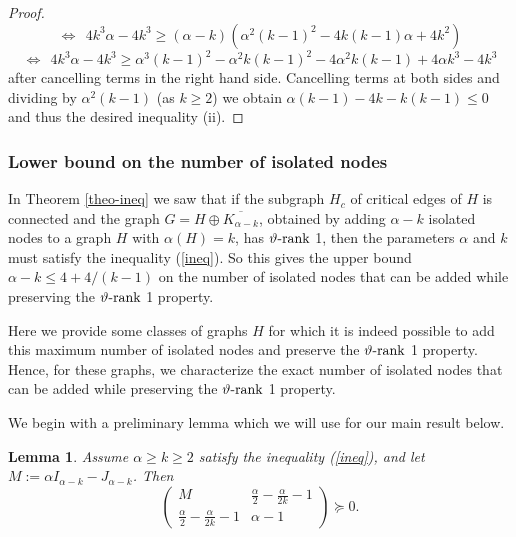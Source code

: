 \documentclass[11pt]{article}
\newtheorem{lemma}[theorem]{Lemma}
\newcommand{\konec}{\MK^{(1)}\text{-certificate}}
\numberwithin{equation}{section}
\newcommand{\MK}{{\mathcal K}}
\newcommand{\rrank}{\vartheta\text{\rm -rank}}
\begin{document}
\begin{proof}
    $$ \Longleftrightarrow \ \ 4 k^3\alpha-4k^3 \geq (\alpha-k)(\alpha^2(k-1)^2-4k(k-1)\alpha+4k^2)
       $$
    $$\Longleftrightarrow \ \ 4k^3\alpha -4k^3\geq \alpha^3(k-1)^2  -\alpha^2k(k-1)^2        -4\alpha^2k(k-1)       +4\alpha k^3  -4k^3$$
after cancelling terms in the right hand side. Cancelling terms at both sides and dividing by $\alpha^2(k-1)$ (as $k\geq2$) we obtain 
    $\alpha(k-1)-4 k- k(k-1)\leq 0$
and thus the desired inequality (ii).
\end{proof}

\subsubsection{Lower bound on the number of isolated nodes  }

In Theorem \ref{theo-ineq}  we saw that if the subgraph $H_c$ of critical edges of $H$ is connected and the graph $G=H\oplus \overline{K_{\alpha-k}}$, obtained by adding $\alpha-k$ isolated nodes to a graph $H$ with $\alpha(H)=k$,  has $\rrank$ 1, then the parameters $\alpha$ and $k$ must satisfy the inequality  (\ref{ineq}).  So this gives the upper bound $\alpha-k\le 4 +4/(k-1)$ on the number of isolated nodes that can be added while preserving the $\rrank$ 1 property.

Here we provide some classes of graphs $H$ for which it is indeed possible to add this  maximum number of isolated nodes and preserve the $\rrank$ 1 property.  Hence, for these graphs, we  characterize the exact number of isolated nodes that can be added while preserving the $\rrank$ 1 property.

We begin with a preliminary lemma which we will use for our main result below.%

\begin{lemma}\label{matrix-psd}
Assume  $\alpha\geq k\geq 2$ satisfy the inequality (\ref{ineq}), and let $M:=\alpha I_{\alpha-k}-J_{\alpha-k}$. Then
    $$
\left(
\begin{array}{c|c}
M & \frac{\alpha}{2}-\frac{\alpha}{2k}-1 \\
\hline
\frac{\alpha}{2}-\frac{\alpha}{2k}-1 & \alpha-1
\end{array}
\right)\succeq 0. $$
\end{lemma}
\end{document}
